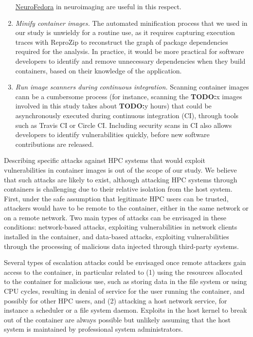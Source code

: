 \documentclass[a4paper,num-refs]{oup-contemporary}
\newcommand{\todo}[1]{\color{red}\textbf{TODO:}#1\color{black}}
\begin{document}
\begin{enumerate}[leftmargin=0pt,itemindent=*]
\href{https://docs.fedoraproject.org/en-US/neurofedora/overview/}{NeuroFedora}
in neuroimaging are useful in this respect.
\item \emph{Minify container images.} The automated minification
process that we used in our study is unwieldy for a routine use, as it
requires capturing execution traces with ReproZip to reconstruct the graph
of package dependencies required for the analysis. In practice, it would be
more practical for software developers to identify and remove unnecessary
dependencies when they build containers, based on their knowledge of the
application.
\item \emph{Run image scanners during continuous integration.} Scanning
container images cann be a cumbersome process (for instance, scanning the
\todo{x} images involved in this study takes about \todo{y} hours) that
could be asynchronously executed during continuous integration (CI),
through tools such as Travis CI or Circle CI. Including security scans in
CI also allows developers to identify vulnerabilities quickly,
before new software contributions are released.
\end{enumerate}

Describing specific attacks against HPC systems that would exploit
vulnerabilities in container images is out of the scope of our study. We
believe that such attacks are likely to exist, although attacking HPC
systems through containers is challenging due to their relative isolation
from the host system. First, under the safe assumption that legitimate HPC
users can be trusted, attackers would have to be remote to the container,
either in the same network or on a remote network. Two main types of
attacks can be envisaged in these conditions: network-based attacks,
exploiting vulnerabilities in network clients installed in the container,
and data-based attacks, exploiting vulnerabilities through the processing
of malicious data injected through third-party systems.

Several types of escalation attacks could be envisaged once remote
attackers gain access to the container, in particular related to (1) using
the resources allocated to the container for malicious use, such as storing
data in the file system or using CPU cycles, resulting in denial of service
for the user running the container, and possibly for other HPC users, and
(2) attacking a host network service, for instance a scheduler or a file
system daemon. Exploits in the host kernel to break out of the container
are always possible but unlikely assuming that the host system is
maintained by professional system administrators.
\end{document}
